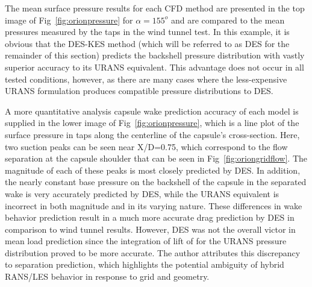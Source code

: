 \documentclass[journal]{new-aiaa}
\begin{document}
The mean surface pressure results for each CFD method are presented in the top image of Fig~\ref{fig:orionpressure} for $\alpha=155^o$ and are compared to the mean pressures measured by the taps in the wind tunnel test. In this example, it is obvious that the DES-KES method (which will be referred to as DES for the remainder of this section) predicts the backshell pressure distribution with vastly superior accuracy to its URANS equivalent. This advantage does not occur in all tested conditions, however, as there are many cases where the less-expensive URANS formulation produces compatible pressure distributions to DES.

A more quantitative analysis capsule wake prediction accuracy of each model is supplied in the lower image of Fig~\ref{fig:orionpressure}, which is a line plot of the surface pressure in taps along the centerline of the capsule's cross-section. Here, two suction peaks can be seen near X/D=0.75, which correspond to the flow separation at the capsule shoulder that can be seen in Fig~\ref{fig:oriongridflow}. The magnitude of each of these peaks is most closely predicted by DES. In addition, the nearly constant base pressure on the backshell of the capsule in the separated wake is very accurately predicted by DES, while the URANS equivalent is incorrect in both magnitude and in its varying nature.  These differences in wake behavior prediction result in a much more accurate drag prediction by DES in comparison to wind tunnel results. However, DES was not the overall victor in mean load prediction since the integration of lift of for the URANS pressure distribution proved to be more accurate. The author attributes this discrepancy to separation prediction, which highlights the potential ambiguity of hybrid RANS/LES behavior in response to grid and geometry.
\end{document}
